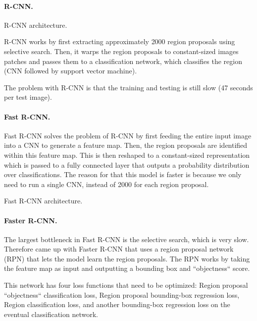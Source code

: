 \paragraph{R-CNN.}

\begin{marginfigure}
    \centering
    \caption{R-CNN architecture.}
    \label{fig:r-cnn}
\end{marginfigure}

R-CNN \citep{girshick2014rich} works by first extracting approximately 2000
region proposals using selective search. Then, it warps the region proposals to
constant-sized images patches and passes them to a classification network,
which classifies the region (CNN followed by support vector machine).

The problem with R-CNN is that the training and testing is still slow (47
seconds per test image).

\paragraph{Fast R-CNN.}

Fast R-CNN \citep{girshick2015fast} solves the problem of R-CNN by first
feeding the entire input image into a CNN to generate a feature map. Then, the
region proposals are identified within this feature map. This is then reshaped
to a constant-sized representation which is passed to a fully connected layer
that outputs a probability distribution over classifications. The reason for
that this model is faster is because we only need to run a single CNN, instead
of 2000 for each region proposal.

\begin{marginfigure}
    \centering
    \caption{Fast R-CNN architecture.}
    \label{fig:fast-r-cnn}
\end{marginfigure}

\paragraph{Faster R-CNN.} 

The largest bottleneck in Fast R-CNN is the selective search, which is very
slow. Therefore \citet{ren2015faster} came up with Faster R-CNN that uses a
region proposal network (RPN) that lets the model learn the region proposals.
The RPN works by taking the feature map as input and outputting a bounding box
and ``objectness`` score.

This network has four loss functions that need to be optimized: Region proposal
``objectness`` classification loss, Region proposal bounding-box regression
loss, Region classification loss, and another bounding-box regression loss on
the eventual classification network.

